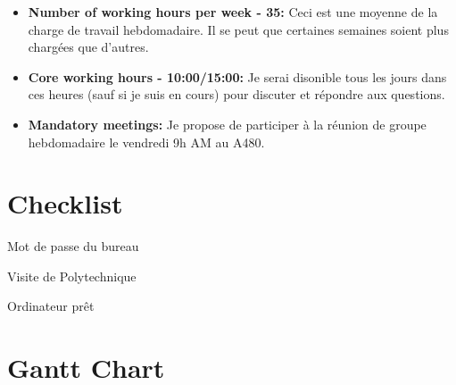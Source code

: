 \documentclass[12pt]{article}
\begin{document}
\begin{itemize}
  \item \textbf{Number of working hours per week - 35: } Ceci est une moyenne de la charge de travail hebdomadaire. Il se peut que certaines semaines soient plus chargées que d'autres.
  \item \textbf{Core working hours - 10:00/15:00: } Je serai disonible tous les jours dans ces heures (sauf si je suis en cours) pour discuter et répondre aux questions.
  \item \textbf{Mandatory meetings: } Je propose de participer à la réunion de groupe hebdomadaire le vendredi 9h AM au A480.
\end{itemize}


\section{Checklist}

\begin{todolist}
  \item Mot de passe du bureau
  \item Visite de Polytechnique
  \item Ordinateur prêt
\end{todolist}

\section{Gantt Chart}
\end{document}
